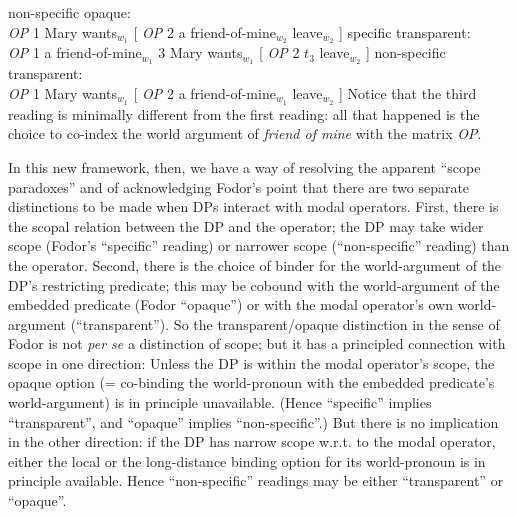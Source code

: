 \pex
\a non-specific opaque:\\
\emph{OP} 1 Mary wants$_{w_1}$ [ \emph{OP} 2 a friend-of-mine$_{w_2}$ leave$_{w_2}$ ]
\a specific transparent:\\
\emph{OP} 1 a friend-of-mine$_{w_1}$ 3 Mary wants$_{w_1}$ [ \emph{OP} 2 $t_3$ leave$_{w_2}$
]
\a non-specific transparent:\\
\emph{OP} 1 Mary wants$_{w_1}$ [ \emph{OP} 2 a friend-of-mine$_{w_1}$ leave$_{w_2}$ ]
\xe
%
Notice that the third reading is minimally different from the first reading: all
that happened is the choice to co-index the world argument of \emph{friend of
  mine} with the matrix \emph{OP}.

In this new framework, then, we have a way of resolving the apparent ``scope
paradoxes'' and of acknowledging Fodor's point that there are two separate
distinctions to be made when DPs interact with modal operators. First, there is
the scopal relation between the DP and the operator; the DP may take wider scope
(Fodor's ``specific'' reading) or narrower scope (``non-specific'' reading) than
the operator. Second, there is the choice of binder for the world-argument of
the DP's restricting predicate; this may be cobound with the world-argument of
the embedded predicate (Fodor ``opaque'') or with the modal operator's own
world-argument (``transparent''). So the transparent/opaque distinction in the
sense of Fodor is not \emph{per se} a distinction of scope; but it has a
principled connection with scope in one direction: Unless the DP is within the
modal operator's scope, the opaque option (= co-binding the world-pronoun with
the embedded predicate's world-argument) is in principle unavailable. (Hence
``specific'' implies ``transparent'', and ``opaque'' implies ``non-specific''.)
But there is no implication in the other direction: if the DP has narrow scope
w.r.t. to the modal operator, either the local or the long-distance binding
option for its world-pronoun is in principle available. Hence ``non-specific''
readings may be either ``transparent'' or ``opaque''.

	
	
